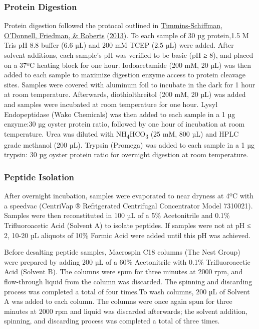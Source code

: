 \documentclass [11pt, proquest] {uwthesis}[2015/03/03]
\begin{document}
\hypertarget{protein-digestion}{%
\subsubsection{Protein Digestion}\label{protein-digestion}}

Protein digestion followed the protocol outlined in \protect\hyperlink{ref-Timmins-Schiffman2013}{Timmins-Schiffman, O'Donnell, Friedman, \& Roberts} (\protect\hyperlink{ref-Timmins-Schiffman2013}{2013}). To each sample of 30 µg protein,1.5 M Tris pH 8.8 buffer (6.6 µL) and 200 mM TCEP (2.5 µL) were added. After solvent additions, each sample's pH was verified to be basic (pH ≥ 8), and placed on a 37ºC heating block for one hour. Iodoacetamide (200 mM, 20 µL) was then added to each sample to maximize digestion enzyme access to protein cleavage sites. Samples were covered with aluminum foil to incubate in the dark for 1 hour at room temperature. Afterwards, diothiolthreitol (200 mM, 20 µL) was added and samples were incubated at room temperature for one hour. Lysyl Endopeptidase (Wako Chemicals) was then added to each sample in a 1 µg enzyme:30 µg oyster protein ratio, followed by one hour of incubation at room temperature. Urea was diluted with NH\textsubscript{4}HCO\textsubscript{3} (25 mM, 800 µL) and HPLC grade methanol (200 µL). Trypsin (Promega) was added to each sample in a 1 µg trypsin: 30 µg oyster protein ratio for overnight digestion at room temperature.

\hypertarget{peptide-isolation}{%
\subsubsection{Peptide Isolation}\label{peptide-isolation}}

After overnight incubation, samples were evaporated to near dryness at 4ºC with a speedvac (CentriVap ® Refrigerated Centrifugal Concentrator Model 7310021). Samples were then reconstituted in 100 µL of a 5\% Acetonitrile and 0.1\% Trifluoroacetic Acid (Solvent A) to isolate peptides. If samples were not at pH ≤ 2, 10-20 µL aliquots of 10\% Formic Acid were added until this pH was achieved.

Before desalting peptide samples, Macrospin C18 columns (The Nest Group) were prepared by adding 200 µL of a 60\% Acetonitrile with 0.1\% Trifluoroacetic Acid (Solvent B). The columns were spun for three minutes at 2000 rpm, and flow-through liquid from the column was discarded. The spinning and discarding process was completed a total of four times.To wash columns, 200 µL of Solvent A was added to each column. The columns were once again spun for three minutes at 2000 rpm and liquid was discarded afterwards; the solvent addition, spinning, and discarding process was completed a total of three times.
\end{document}
